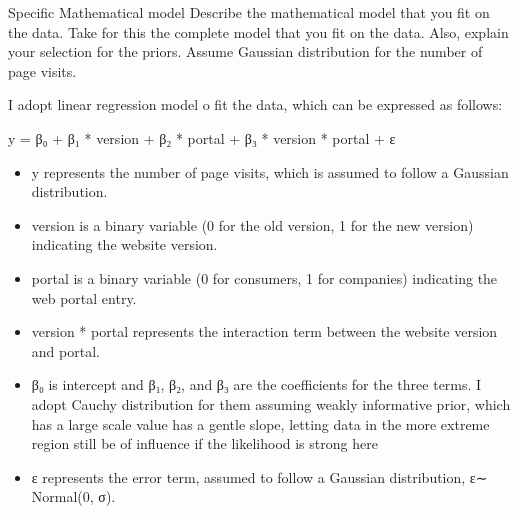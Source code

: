 \documentclass[
  ignorenonframetext,
]{beamer}
\providecommand{\tightlist}{%
  \setlength{\itemsep}{0pt}\setlength{\parskip}{0pt}}
\begin{document}
\begin{frame}{Specific Mathematical model}
\protect\hypertarget{specific-mathematical-model}{}
Describe the mathematical model that you fit on the data. Take for this
the complete model that you fit on the data. Also, explain your
selection for the priors. Assume Gaussian distribution for the number of
page visits.

I adopt linear regression model o fit the data, which can be expressed
as follows:

y = β₀ + β₁ * version + β₂ * portal + β₃ * version * portal + ε

\begin{itemize}
\tightlist
\item
  y represents the number of page visits, which is assumed to follow a
  Gaussian distribution.
\item
  version is a binary variable (0 for the old version, 1 for the new
  version) indicating the website version.
\item
  portal is a binary variable (0 for consumers, 1 for companies)
  indicating the web portal entry.
\item
  version * portal represents the interaction term between the website
  version and portal.
\item
  β₀ is intercept and β₁, β₂, and β₃ are the coefficients for the three
  terms. I adopt Cauchy distribution for them assuming weakly
  informative prior, which has a large scale value has a gentle slope,
  letting data in the more extreme region still be of influence if the
  likelihood is strong here
\item
  ε represents the error term, assumed to follow a Gaussian
  distribution, ε∼ Normal(0, σ).
\end{itemize}
\end{frame}
\end{document}
